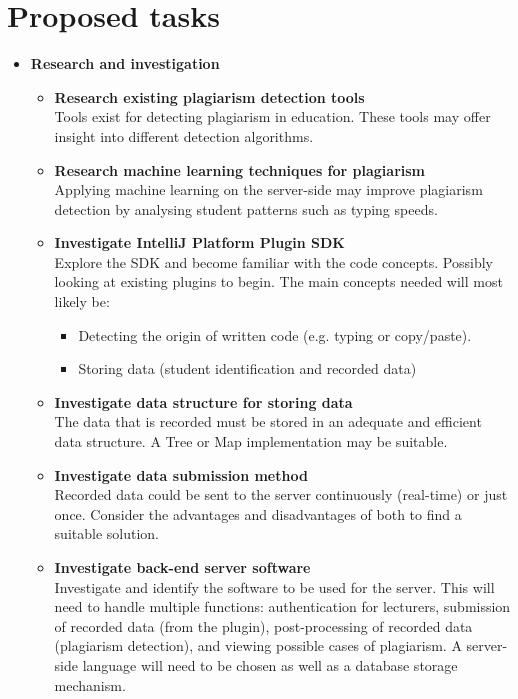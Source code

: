 \section{Proposed tasks}

\begin{itemize}
  \item \textbf{Research and investigation}
  \begin{itemize}
    \item \textbf{Research existing plagiarism detection tools}\\Tools exist for detecting plagiarism in education. These tools may offer insight into different detection algorithms.
    \item \textbf{Research machine learning techniques for plagiarism}\\Applying machine learning on the server-side may improve plagiarism detection by analysing student patterns such as typing speeds.
    \item \textbf{Investigate IntelliJ Platform Plugin SDK}\\Explore the SDK and become familiar with the code concepts. Possibly looking at existing plugins to begin. The main concepts needed will most likely be:
    \begin{itemize}
      \item Detecting the origin of written code (e.g. typing or copy/paste).
      \item Storing data (student identification and recorded data)
    \end{itemize}
    \item \textbf{Investigate data structure for storing data}\\The data that is recorded must be stored in an adequate and efficient data structure. A Tree or Map implementation may be suitable.
    \item \textbf{Investigate data submission method}\\Recorded data could be sent to the server continuously (real-time) or just once. Consider the advantages and disadvantages of both to find a suitable solution.
    \item \textbf{Investigate back-end server software}\\Investigate and identify the software to be used for the server. This will need to handle multiple functions: authentication for lecturers, submission of recorded data (from the plugin), post-processing of recorded data (plagiarism detection), and viewing possible cases of plagiarism. A server-side language will need to be chosen as well as a database storage mechanism.

\end{itemize}
\end{itemize}

